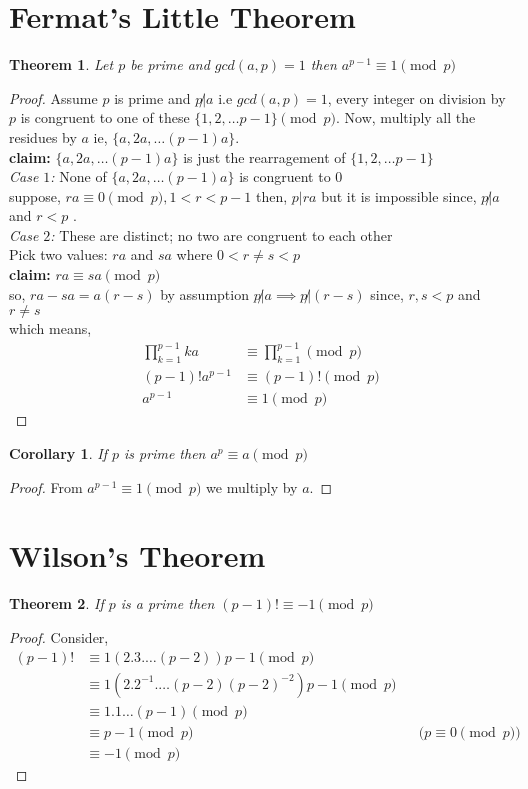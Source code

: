 \documentclass[12pt,a4paper]{article}
\newtheorem{thm}{Theorem}
\newtheorem{cor}{Corollary}
\begin{document}
\section{Fermat's Little Theorem}
\begin{thm}\normalfont
	Let $p$ be prime and $gcd(a,p)=1$ then $a^{p-1} \equiv 1 \pmod p$
\end{thm}
\begin{proof}
	Assume $p$ is prime and $p\not | a$ i.e $gcd(a,p)=1$, every integer on division by $p$ is congruent to one of these $\{1,2,\dots p-1\} \pmod p$. Now, multiply all the residues by $a$ ie, $\{a,2a,\dots (p-1)a\}$.\\ 
	\textbf{claim: } $\{a,2a,\dots (p-1)a\}$ is just the rearragement of $\{1,2,\dots p-1\}$\\
	\textit{Case $1$:} None of  $\{a,2a,\dots (p-1)a\}$ is congruent to $0$\\
	suppose, $ra \equiv 0 \pmod p, 1<r<p-1$ then, $p|ra$ but it is impossible since, $p\not | a$ and $r<p$ .\\
	\textit{Case $2$:} These are distinct; no two are congruent to each other\\
	Pick two values: $ra$ and $sa$ where $0<r \not = s <p$\\
	\textbf{claim:} $ra\equiv sa \pmod p$\\
	so, $ra-sa=a(r-s)$ by assumption $p\not | a \implies p\not | (r-s)$ since, $r,s<p$ and $r\not = s$\\
	which means,
	\begin{align*}
		\prod_{k=1}^{p-1} ka & \equiv \prod_{k=1}^{p-1} \pmod p \\
		(p-1)!a^{p-1} & \equiv (p-1)! \pmod p \\
		a^{p-1} & \equiv 1 \pmod p
	\end{align*}
\end{proof}
\begin{cor}\normalfont
	If $p$ is prime then $a^{p} \equiv a \pmod p$
\end{cor}
\begin{proof}
	From $a^{p-1} \equiv 1 \pmod p$ we multiply by $a$.
\end{proof}
\section{Wilson's Theorem}
\begin{thm}\normalfont
	If $p$ is a prime then $(p-1)! \equiv -1 \pmod p$ 
\end{thm}
\begin{proof}
	Consider,
	\begin{align*}
	(p-1)! & \equiv 1(2.3.\dots (p-2)) p-1 \pmod p \\
		& \equiv 1(2.2^{-1}.\dots (p-2)(p-2)^{-2}) p-1 \pmod p \\
		& \equiv 1.1\dots (p-1) \pmod p \\
		& \equiv p-1 \pmod p  && \text{($p \equiv 0 \pmod p$)} \\
		& \equiv -1 \pmod p 
	\end{align*}

\end{proof}
\end{document}

